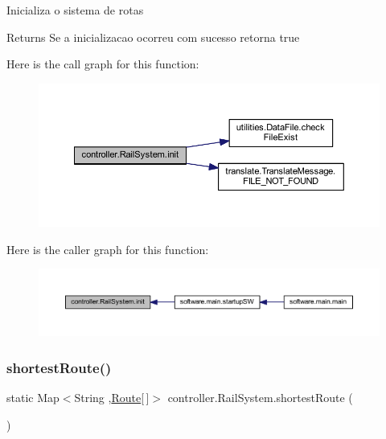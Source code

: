 Inicializa o sistema de rotas

\begin{DoxyReturn}{Returns}
Se a inicializacao ocorreu com sucesso retorna true 
\end{DoxyReturn}
Here is the call graph for this function\+:\nopagebreak
\begin{figure}[H]
\begin{center}
\leavevmode
\includegraphics[width=350pt]{classcontroller_1_1_rail_system_aaa1ab4d489fd21a5e968723c2afd89b2_cgraph}
\end{center}
\end{figure}
Here is the caller graph for this function\+:\nopagebreak
\begin{figure}[H]
\begin{center}
\leavevmode
\includegraphics[width=350pt]{classcontroller_1_1_rail_system_aaa1ab4d489fd21a5e968723c2afd89b2_icgraph}
\end{center}
\end{figure}
\mbox{\label{classcontroller_1_1_rail_system_a4eccf86f1b3525490c6d44b0522d746b}} 
\subsubsection{\texorpdfstring{shortest\+Route()}{shortestRoute()}}
{\footnotesize\ttfamily static Map$<$String ,\hyperlink{classdomain_1_1_route}{Route}\mbox{[}$\,$\mbox{]}$>$ controller.\+Rail\+System.\+shortest\+Route (\begin{DoxyParamCaption}{ }\end{DoxyParamCaption})\hspace{0.3cm}{\ttfamily [static]}}

